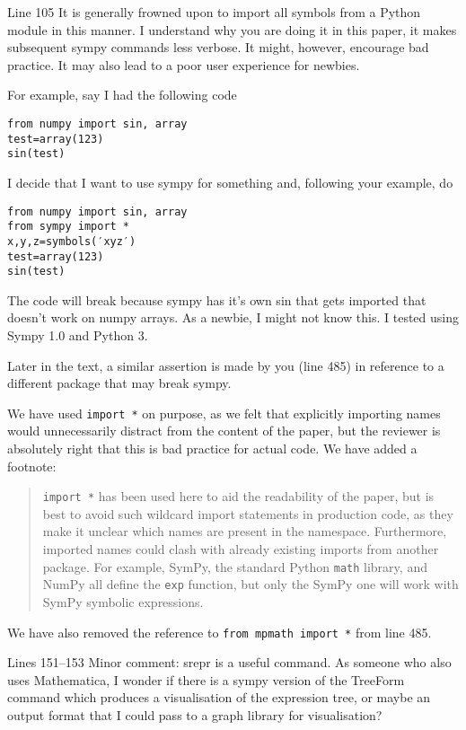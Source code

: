 \documentclass[answers,12pt]{exam}
\begin{document}
\begin{questions}
\question Line 105
It is generally frowned upon to import all symbols from a Python module in this manner.
I understand why you are doing it in this paper, it makes subsequent sympy commands less verbose.
It might, however, encourage bad practice. It may also lead to a poor user experience for newbies.
\label{rev1point1}

For example, say I had the following code

\begin{verbatim}
from numpy import sin, array
test=array(123)
sin(test)
\end{verbatim}

I decide that I want to use sympy for something and, following your example, do

\begin{verbatim}
from numpy import sin, array
from sympy import *
x,y,z=symbols(′xyz′)
test=array(123)
sin(test)
\end{verbatim}

The code will break because sympy has it's own sin that gets imported that doesn't work on numpy arrays. As a newbie, I might not know this.
I tested using Sympy 1.0 and Python 3.

Later in the text, a similar assertion is made by you (line 485) in reference to a different package that may break sympy.

\begin{solution}
We have used \verb|import *| on purpose, as we felt that explicitly importing
names would unnecessarily distract from the content of the paper, but the
reviewer is absolutely right that this is bad practice for actual code. We
have added a footnote:
\begin{quote}\texttt{import *} has been used here to aid the
  readability of the paper, but is best to avoid such wildcard import
  statements in production code, as they make it unclear which names are
  present in the namespace. Furthermore, imported names could clash with
  already existing imports from another package. For example, SymPy, the
  standard Python \texttt{math} library, and NumPy all define the \texttt{exp}
  function, but only the SymPy one will work with SymPy symbolic expressions.
\end{quote}

We have also removed the reference to \texttt{from mpmath import *} from line 485.
\end{solution}

\question Lines 151--153
Minor comment: srepr is a useful command. As someone who also uses Mathematica, I wonder if there is a sympy version of the TreeForm command which produces a visualisation of the expression tree, or maybe an output format that I could pass to a graph library for visualisation?


\end{questions}
\end{document}
